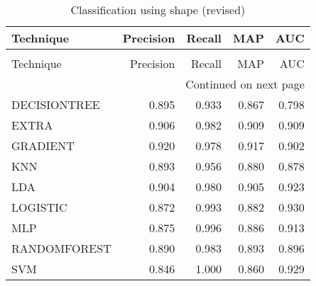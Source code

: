 \begin{longtable}{lrrrr}
\caption[Classification using shape (revised)]{Classification using shape (revised)}
\label{table:color-auc}\\
\toprule
   Technique &  Precision &  Recall &   MAP &   AUC \\
\midrule
\endfirsthead
\caption[]{Classification using shape (revised)} \\
\toprule
   Technique &  Precision &  Recall &   MAP &   AUC \\
\midrule
\endhead
\midrule
\multicolumn{5}{r}{{Continued on next page}} \\
\midrule
\endfoot

\bottomrule
\endlastfoot
DECISIONTREE &      0.895 &   0.933 & 0.867 & 0.798 \\
       EXTRA &      0.906 &   0.982 & 0.909 & 0.909 \\
    GRADIENT &      0.920 &   0.978 & 0.917 & 0.902 \\
         KNN &      0.893 &   0.956 & 0.880 & 0.878 \\
         LDA &      0.904 &   0.980 & 0.905 & 0.923 \\
    LOGISTIC &      0.872 &   0.993 & 0.882 & 0.930 \\
         MLP &      0.875 &   0.996 & 0.886 & 0.913 \\
RANDOMFOREST &      0.890 &   0.983 & 0.893 & 0.896 \\
         SVM &      0.846 &   1.000 & 0.860 & 0.929 \\
\end{longtable}
